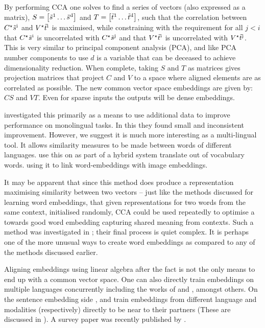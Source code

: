 \documentclass[parskip]{komatufte}
\begin{document}
%
By performing CCA one solves to find a series of vectors (also expressed as a matrix), $S=\left[ \dv s_1 \ldots \dv s_d \right]$ and $T= \left[ \dv t_1 \ldots \dv t_d \right]$,
such that the correlation between $\d C_\star \dv s_i$ and $\d V_\star \dv t_i$ is maximised,
while constraining with the requirement for all $j<i$ that $\d C_\star \dv s_i$ is uncorrelated with $\d C_\star \dv s_j$  and that  $ \d V_\star \dv t_i$ is uncorrelated with $\d V_\star \dv t_j$.
This is very similar to principal component analysis (PCA), and like PCA number components to use $d$ is a variable that can be deceased to achieve dimensionality reduction.
When complete, taking $S$ and $T$ as matrices gives projection matrices that project $C$ and $V$ to a space where aligned elements are as correlated as possible.
The new common vector space embeddings are given by:
$C S$ and $V T$.
Even for sparse inputs the outputs will be dense embeddings.

\textcite{faruqui2014improving} investigated this primarily as a means to use additional data to improve performance on monolingual tasks.
In this they found small and inconsistent improvement.
However, we suggest it is much more interesting as a multi-lingual tool.
It allows similarity measures to be made between words of different languages.
 use this on as part of a hybrid system translate out of vocabulary words.
 using it to link word-embeddings with image embeddings.


It may be apparent that since this method does produce a representation maximising similarity between two vectors -- just like the methods discussed for learning word embeddings,
that given representations for two words from the same context, initialised randomly,
CCA could be used repeatedly to optimise a towards good word embedding capturing shared meaning from contexts.
Such a method was investigated in ; their final process is quiet complex.
It is perhaps one of the more unusual ways to create word embeddings as compared to any of the methods discussed earlier.

Aligning embeddings using linear algebra after the fact is not the only means to end up with a common vector space.
One can also directly train embeddings on multiple languages concurrently including the works of  and , amongst others.
On the sentence embedding side , and  train embeddings from different language and modalities (respectively) directly to be near to their partners (These are discussed in ).
A survey paper was recently published by \textcite{Ruder17crosslingreview}.


\end{document}
